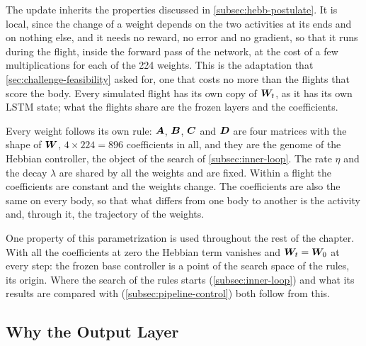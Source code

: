 The update inherits the properties discussed in \autoref{subsec:hebb-postulate}. It is local, since the change of a weight depends on the two activities at its ends and on nothing else, and it needs no reward, no error and no gradient, so that it runs during the flight, inside the forward pass of the network, at the cost of a few multiplications for each of the 224 weights. This is the adaptation that \autoref{sec:challenge-feasibility} asked for, one that costs no more than the flights that score the body. Every simulated flight has its own copy of $\bm{W}_t$, as it has its own LSTM state; what the flights share are the frozen layers and the coefficients.

Every weight follows its own rule: $\bm{A}$, $\bm{B}$, $\bm{C}$ and $\bm{D}$ are four matrices with the shape of $\bm{W}$, $4 \times 224 = 896$ coefficients in all, and they are the genome of the Hebbian controller, the object of the search of \autoref{subsec:inner-loop}. The rate $\eta$ and the decay $\lambda$ are shared by all the weights and are fixed. Within a flight the coefficients are constant and the weights change. The coefficients are also the same on every body, so that what differs from one body to another is the activity and, through it, the trajectory of the weights.

One property of this parametrization is used throughout the rest of the chapter. With all the coefficients at zero the Hebbian term vanishes and $\bm{W}_t = \bm{W}_0$ at every step: the frozen base controller is a point of the search space of the rules, its origin. Where the search of the rules starts (\autoref{subsec:inner-loop}) and what its results are compared with (\autoref{subsec:pipeline-control}) both follow from this.

\subsection{Why the Output Layer}
\label{subsec:hebbian-why-output}


